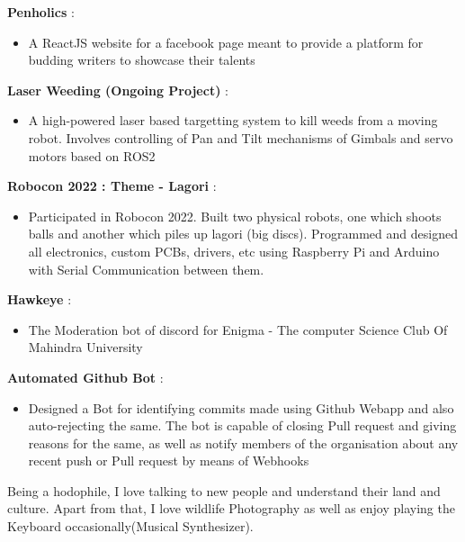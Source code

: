 \documentclass[a4paper, oneside, 12pt]{article}
\makeatletter
\def\vhrulefill#1{\leavevmode\leaders\hrule\@height#1\hfill \kern\z@}
\makeatother
\begin{document}
\begin{flushleft}

    \color{gray}{\vhrulefill{1.5pt}}

  \vspace{2mm}
  \color{black}
  \textbf{Penholics }:
  \begin{itemize}[label =]
    \item A ReactJS website for a facebook page meant to provide a platform for budding writers to showcase their talents
  \end{itemize}

  \textbf{Laser Weeding (Ongoing Project) }:
  \begin{itemize}[label =]
    \item A high-powered laser based targetting system to kill weeds from a moving robot. Involves controlling of Pan and Tilt mechanisms of Gimbals and servo motors based on ROS2
  \end{itemize}

  \textbf{Robocon 2022 : Theme - Lagori }:
  \begin{itemize}[label =]
    \item Participated in Robocon 2022. Built two physical robots, one which shoots balls and another which piles up lagori (big discs). Programmed and designed all electronics, custom PCBs, drivers, etc using Raspberry Pi and Arduino with Serial Communication between them.
  \end{itemize}

  \textbf{Hawkeye }:
  \begin{itemize}[label =]
    \item The Moderation bot of discord for Enigma - The computer Science Club Of Mahindra University
  \end{itemize}

  \textbf{Automated Github Bot }:
  \begin{itemize}[label =]
    \item Designed a Bot for identifying commits made using Github Webapp and also auto-rejecting the same. The bot is capable of closing Pull request and giving reasons for the same, as well as notify members of the organisation about any recent push or Pull request by means of Webhooks
  \end{itemize}
\end{flushleft}

\pagebreak



\begin{flushleft}
    \color{gray}{\vhrulefill{1.5pt}}
  \vspace{2mm}

  \color{black}
  Being a hodophile, I love talking to new people and understand their land and culture.
  Apart from that, I love wildlife Photography as well as enjoy playing the Keyboard occasionally(Musical Synthesizer).

\end{flushleft}
\end{document}

